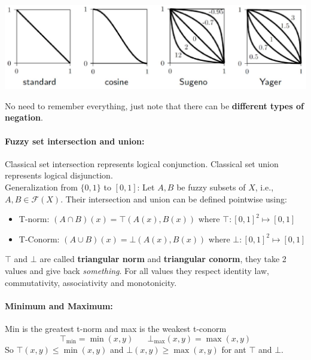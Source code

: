 \documentclass[11pt]{article}
\begin{document}
		\begin{center}
			\includegraphics[width=0.95\columnwidth]{img/FS/famneg}
		\end{center}
		
		No need to remember everything, just note that there can be \textbf{different types of negation}.\\
		
		\newpage
		
		\paragraph{Fuzzy set intersection and union:} Classical set intersection represents logical conjunction. Classical set union represents logical disjunction. \\
		
		Generalization from $\{0,1\}$ to $[0,1]$: Let $A, B$ be fuzzy subsets of $X$, i.e., $A,B \in \mathcal{F} (X)$. Their intersection and union can be defined pointwise using: 
		\begin{itemize}[label*=]
			\item T-norm: $(A \cap B) (x) = \top (A(x), B(x))$ where $\top : [0,1]^2 \mapsto [0,1]$
			\item T-Conorm: $(A \cup B) (x) = \bot (A(x), B(x))$ where $\bot : [0,1]^2 \mapsto [0,1]$
		\end{itemize}
		
		$\top$ and $\bot$ are called \textbf{triangular norm} and \textbf{triangular conorm}, they take 2 values and give back \textit{something}. For all values they respect identity law, commutativity, associativity and monotonicity. \\
		
		\paragraph{Minimum and Maximum:} Min is the greatest t-norm and max is the weakest t-conorm
		$$ \top_{\min} = \min (x, y) \;\;\;\;\;\; \bot_{\max} (x,y) = \max (x, y)$$
		So $\top (x,y) \leq \min (x,y)$ and $\bot (x,y) \geq \max (x,y)$ for ant $\top$ and $\bot$.\\
		
\end{document}
